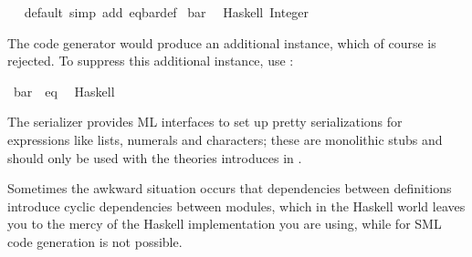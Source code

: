 \begin{isabellebody}
\isanewline
{}\isamarkupfalse%
%
\isadelimproof
\ %
\endisadelimproof
%
\isatagproof
{}\isamarkupfalse%
\ default\ {\isacharparenleft}simp\ add{\isacharcolon}\ eq{\isacharunderscore}bar{\isacharunderscore}def{\isacharparenright}%
\endisatagproof
{\isafoldproof}%
%
\isadelimproof
%
\endisadelimproof
\isanewline
\isanewline
{}\isamarkupfalse%
\isanewline
%
\isadelimtt
\isanewline
%
\endisadelimtt
%
\isatagtt
{}\isamarkupfalse%
\ bar\isanewline
\ \ {\isacharparenleft}Haskell\ {\isachardoublequoteopen}Integer{\isachardoublequoteclose}{\isacharparenright}%
\endisatagtt
{\isafoldtt}%
%
\isadelimtt
%
\endisadelimtt
%
\begin{isamarkuptext}%
The code generator would produce
  an additional instance, which of course is rejected.
  To suppress this additional instance, use
  \isa{{\isasymCODEINSTANCE}}:%
\end{isamarkuptext}%
\isamarkuptrue%
%
\isadelimtt
%
\endisadelimtt
%
\isatagtt
{}\isamarkupfalse%
\ bar\ {\isacharcolon}{\isacharcolon}\ eq\isanewline
\ \ {\isacharparenleft}Haskell\ {\isacharminus}{\isacharparenright}%
\endisatagtt
{\isafoldtt}%
%
\isadelimtt
%
\endisadelimtt
%
\isamarkuptrue%
%
\begin{isamarkuptext}%
The serializer provides ML interfaces to set up
  pretty serializations for expressions like lists, numerals
  and characters;  these are
  monolithic stubs and should only be used with the
  theories introduces in .%
\end{isamarkuptext}%
\isamarkuptrue%
%
\isamarkuptrue%
%
\begin{isamarkuptext}%
Sometimes the awkward situation occurs that dependencies
  between definitions introduce cyclic dependencies
  between modules, which in the Haskell world leaves
  you to the mercy of the Haskell implementation you are using,
  while for SML code generation is not possible.


\end{isamarkuptext}
\end{isabellebody}
